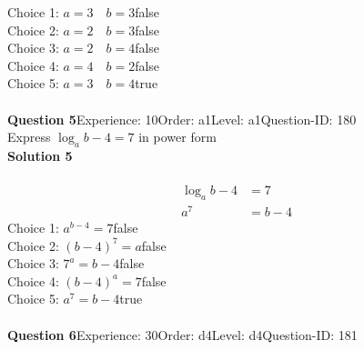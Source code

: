 \documentclass{article}
\begin{document}
Choice 1: \hspace{20pt}$a=3\quad b=3$\hspace{20pt}false\\
Choice 2: \hspace{20pt}$a=2\quad b=3$\hspace{20pt}false\\
Choice 3: \hspace{20pt}$a=2\quad b=4$\hspace{20pt}false\\
Choice 4: \hspace{20pt}$a=4\quad b=2$\hspace{20pt}false\\
Choice 5: \hspace{20pt}$a=3\quad b=4$\hspace{20pt}true\\
\\[4pt]
\noindent\textbf{Question 5}\hspace{20pt}Experience: 10\hspace{20pt}Order: a1\hspace{20pt}Level: a1\hspace{20pt}Question-ID: 180\\[2pt]
Express $\log_{a}b-4=7$ in power form\\[4pt]
\noindent\textbf{Solution 5}\\[2pt]
\\[-35pt]\begin{align*}
\log_{a}b-4&=7\\[2pt]
a^7&=b-4
\end{align*}
Choice 1: \hspace{20pt}$a^{b-4}=7$\hspace{20pt}false\\
Choice 2: \hspace{20pt}$(b-4)^7=a$\hspace{20pt}false\\
Choice 3: \hspace{20pt}$7^a=b-4$\hspace{20pt}false\\
Choice 4: \hspace{20pt}$(b-4)^a=7$\hspace{20pt}false\\
Choice 5: \hspace{20pt}$a^7=b-4$\hspace{20pt}true\\
\\[4pt]
\noindent\textbf{Question 6}\hspace{20pt}Experience: 30\hspace{20pt}Order: d4\hspace{20pt}Level: d4\hspace{20pt}Question-ID: 181\\[2pt]
\end{document}
